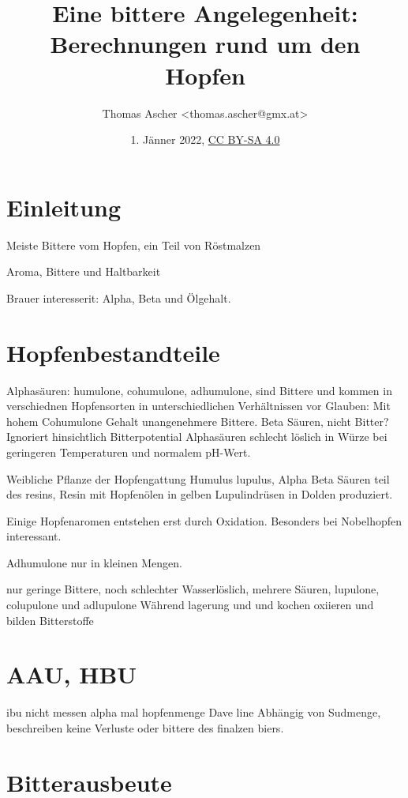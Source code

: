 \documentclass[a4paper,parskip=half]{scrartcl}
\title{Eine bittere Angelegenheit: Berechnungen rund um den Hopfen}
\author{Thomas Ascher <thomas.ascher@gmx.at>}
\date{1. Jänner 2022, \href{http://creativecommons.org/licenses/by-sa/4.0/}{CC BY-SA 4.0}}
\begin{document}
\maketitle

\section*{Einleitung}

Meiste Bittere vom Hopfen, ein Teil von Röstmalzen \parencite[11]{Garetz1994}

\parencite[10]{Garetz1994}
Aroma, Bittere und Haltbarkeit

\parencite[103]{Garetz1994}
Brauer interesserit: Alpha, Beta und Ölgehalt.

\section*{Hopfenbestandteile}

\parencite[11]{Garetz1994}
Alphasäuren: humulone, cohumulone, adhumulone, sind Bittere und kommen in
verschiednen Hopfensorten in unterschiedlichen Verhältnissen vor
Glauben: Mit hohem Cohumulone Gehalt unangenehmere Bittere.
Beta Säuren, nicht Bitter? Ignoriert hinsichtlich Bitterpotential
Alphasäuren schlecht löslich in Würze bei geringeren Temperaturen
und normalem pH-Wert.

\parencite[20]{Garetz1994}
Weibliche Pflanze der Hopfengattung Humulus lupulus, Alpha Beta
Säuren teil des resins, Resin mit Hopfenölen in gelben
Lupulindrüsen in Dolden produziert.

\parencite[100]{Garetz1994} Einige Hopfenaromen entstehen erst
durch Oxidation. Besonders bei Nobelhopfen interessant.

\parencite[119]{Garetz1994} 
Adhumulone nur in kleinen Mengen.

\parencite[120]{Garetz1994} 
nur geringe Bittere, noch schlechter Wasserlöslich, mehrere Säuren,
lupulone, colupulone und adlupulone
Während lagerung und und kochen oxiieren und bilden Bitterstoffe

\section*{AAU, HBU}

\parencite[122\psq]{Garetz1994} 
ibu nicht messen
alpha mal hopfenmenge
Dave line
Abhängig von Sudmenge, beschreiben keine Verluste oder bittere
des finalzen biers.

\section*{Bitterausbeute}
\end{document}
